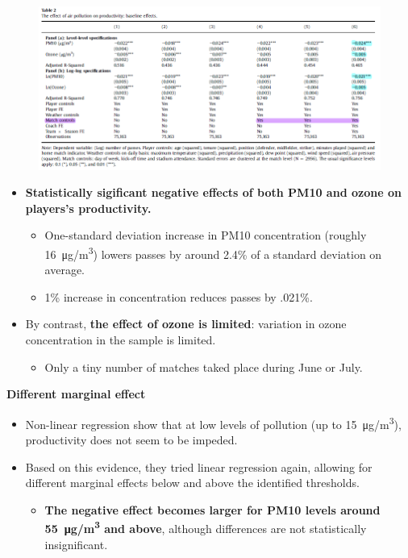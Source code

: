 \documentclass[../root]{subfiles}
\begin{document}
    \begin{figure}[H]
      \centering
      \includegraphics[scale = 1]{0522tanji/t2}
      \label{t2}
    \end{figure}

    \begin{itemize}
      \item \textbf{Statistically sigificant negative effects of both PM10 and ozone on players's productivity.}
      \begin{itemize}
        \item One-standard deviation increase in PM10 concentration (roughly  \SI{16}{\micro g/m^3}) lowers passes by around 2.4\% of a standard deviation on average.
        \item 1\% increase in concentration reduces passes by .021\%.
      \end{itemize}
      \item By contrast, \textbf{the effect of ozone is limited}: variation in ozone concentration in the sample is limited.
      \begin{itemize}
        \item Only a tiny number of matches taked place during June or July.
      \end{itemize}
    \end{itemize}

    \textbf{Different marginal effect}

    \begin{itemize}
      \item Non-linear regression show that at low levels of pollution (up to \SI{15}{\micro g/m^3}), productivity does not seem to be impeded.
      \item Based on this evidence, they tried linear regression again, allowing for different marginal effects below and above the identified thresholds.
      \begin{itemize}
        \item \textbf{The negative effect becomes larger for PM10 levels around \SI{55}{\micro g/m^3} and above}, although differences are not statistically insignificant.
      \end{itemize}
    \end{itemize}
\end{document}
